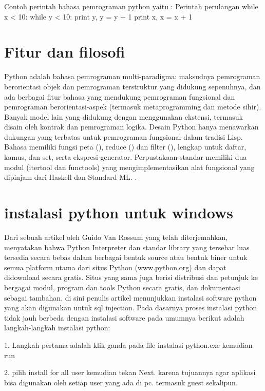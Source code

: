       Contoh perintah bahasa pemrograman python yaitu :
      Perintah perulangan
      while x < 10: 
      	   while y < 10: 
		print y, 
		y = y + 1 
	   print x,
	   x = x + 1

      
  \section {Fitur dan filosofi}
	Python adalah bahasa pemrograman multi-paradigma: maksudnya pemrograman berorientasi objek dan pemrograman terstruktur 
	yang didukung sepenuhnya, dan ada berbagai fitur bahasa yang mendukung pemrograman fungsional dan pemrograman berorientasi-aspek
	(termasuk metaprogramming dan metode sihir). Banyak model lain yang didukung dengan menggunakan ekstensi, termasuk disain 
	oleh kontrak dan pemrograman logika. 
	Desain Python hanya menawarkan dukungan yang terbatas untuk pemrograman fungsional dalam tradisi Lisp. 
	Bahasa memiliki fungsi peta (), reduce () dan filter (), lengkap untuk daftar, kamus, dan set, serta ekspresi generator. 
	Perpustakaan standar memiliki dua modul (itertool dan functools) yang mengimplementasikan alat fungsional yang dipinjam 
	dari Haskell dan Standard ML. \cite {van2007python}.

   \section {instalasi python untuk windows}

	Dari sebuah artikel oleh Guido Van Rossum yang telah diterjemahkan, menyatakan bahwa Python Interpreter dan standar library 
	yang tersebar luas tersedia secara bebas dalam berbagai bentuk source atau bentuk biner untuk semua platform utama dari situs 
	Python (www.python.org) dan dapat didownload secara gratis. Situs yang sama juga berisi distribusi dan petunjuk ke bergagai 
	modul, program dan tools Python secara gratis, dan dokumentasi sebagai tambahan. \cite {van1995python}
	di sini penulis artikel menunjukkan instalasi software python yang akan
	digunakan untuk sql injection. Pada dasarnya proses instalasi python tidak jauh berbeda dengan instalasi software pada umumnya
	berikut adalah langkah-langkah instalasi python:

	1. Langkah pertama adalah klik ganda pada file instalasi python.exe
	kemudian run

	2. pilih install for all user kemudian tekan Next. karena tujuannya
	agar aplikasi bisa digunakan oleh setiap user yang ada di pc.
	termasuk guest sekalipun.
			
